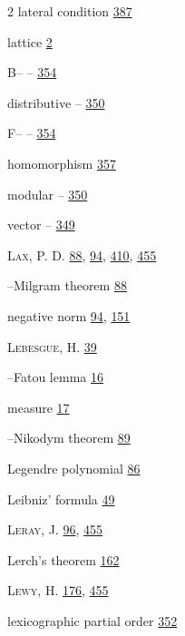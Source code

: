 \begin{multicols}{2}
\noindent lateral condition \hyperlink{page.387}{387}\par
\noindent lattice \hyperlink{page.2}{2}\par
\hspace*{1.1em}B-- -- \hyperlink{page.354}{354}\par
\hspace*{1.1em}distributive -- \hyperlink{page.350}{350}\par
\hspace*{1.1em}F-- -- \hyperlink{page.354}{354}\par
\hspace*{1.1em}homomorphism \hyperlink{page.357}{357}\par
\hspace*{1.1em}modular -- \hyperlink{page.350}{350}\par
\hspace*{1.1em}vector -- \hyperlink{page.349}{349}\par
\noindent \textsc{Lax}, P. D. \hyperlink{page.88}{88}, \hyperlink{page.94}{94}, \hyperlink{page.410}{410}, \hyperlink{page.455}{455}\par
\hspace*{1.1em}--Milgram theorem \hyperlink{page.88}{88}\par
\hspace*{1.1em}negative norm \hyperlink{page.94}{94}, \hyperlink{page.151}{151}\par
\noindent \textsc{Lebesgue}, H. \hyperlink{page.39}{39}\par
\hspace*{1.1em}--Fatou lemma \hyperlink{page.16}{16}\par
\hspace*{1.1em}measure \hyperlink{page.17}{17}\par
\hspace*{1.1em}--Nikodym theorem \hyperlink{page.89}{89}\par
\noindent Legendre polynomial \hyperlink{page.86}{86}\par
\noindent Leibniz' formula \hyperlink{page.49}{49}\par
\noindent \textsc{Leray}, J. \hyperlink{page.96}{96}, \hyperlink{page.455}{455}\par
\noindent Lerch's theorem \hyperlink{page.162}{162}\par
\noindent \textsc{Lewy}, H. \hyperlink{page.176}{176}, \hyperlink{page.455}{455}\par
\noindent lexicographic partial order \hyperlink{page.352}{352}\par

\end{multicols}
